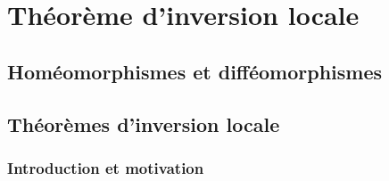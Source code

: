 \chapter{Théorème d'inversion locale}

\section{Homéomorphismes et difféomorphismes}

\section{Théorèmes d'inversion locale}

\subsection{Introduction et motivation}
